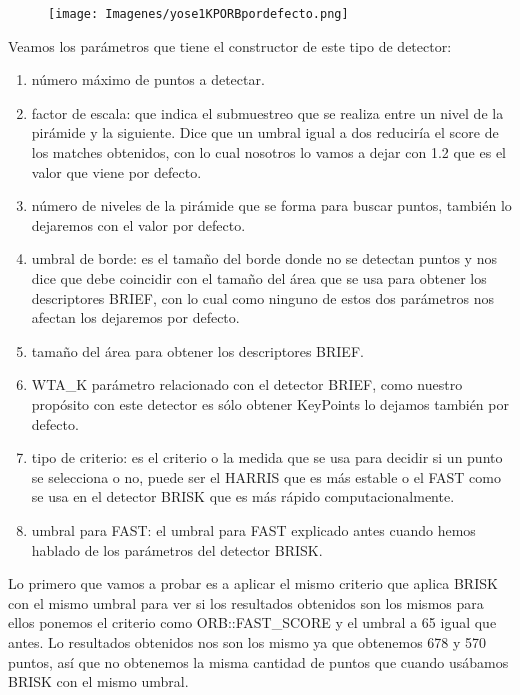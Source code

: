 \documentclass[10pt,a4paper]{article}
\begin{document}
\begin{figure}[H]
\centering
\texttt{[image: Imagenes/yose1KPORBpordefecto.png]}
\end{figure}

Veamos los parámetros que tiene el constructor de este tipo de detector:\\

\begin{enumerate}
\item número máximo de puntos a detectar.
\item factor de escala: que indica el submuestreo que se realiza entre un nivel de la pirámide y la siguiente. Dice que un umbral igual a dos reduciría el score de los matches obtenidos, con lo cual nosotros lo vamos a dejar con 1.2 que es el valor que viene por defecto.
\item número de niveles de la pirámide que se forma para buscar puntos, también lo dejaremos con el valor por defecto.
\item umbral de borde: es el tamaño del borde donde no se detectan puntos y nos dice que debe coincidir con el tamaño del área que se usa para obtener los descriptores BRIEF, con lo cual como ninguno de estos dos parámetros nos afectan los dejaremos por defecto.
\item tamaño del área para obtener los descriptores BRIEF.
\item WTA\_K parámetro relacionado con el detector BRIEF, como nuestro propósito con este detector es sólo obtener KeyPoints lo dejamos también por defecto.
\item tipo de criterio: es el criterio o la medida que se usa para decidir si un punto se selecciona o no, puede ser el HARRIS que es más estable o el FAST como se usa en el detector BRISK que es más rápido computacionalmente.
\item umbral para FAST: el umbral para FAST explicado antes cuando hemos hablado de los parámetros del detector BRISK.
\end{enumerate}

Lo primero que vamos a probar es a aplicar el mismo criterio que aplica BRISK con el mismo umbral para ver si los resultados obtenidos son los mismos para ellos ponemos el criterio como ORB::FAST\_SCORE y el umbral a 65 igual que antes. Lo resultados obtenidos nos son los mismo ya que obtenemos 678 y 570 puntos, así que no obtenemos la misma cantidad de puntos que cuando usábamos BRISK con el mismo umbral.\\
\end{document}
